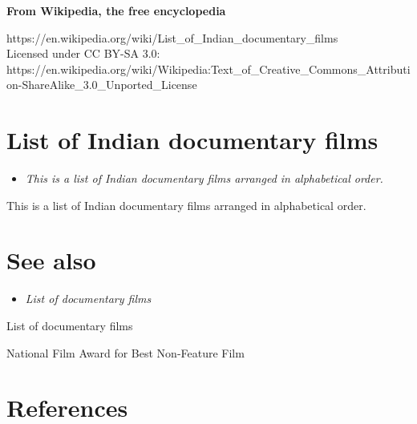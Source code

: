 \textbf{From Wikipedia, the free encyclopedia}

https://en.wikipedia.org/wiki/List\_of\_Indian\_documentary\_films\\
Licensed under CC BY-SA 3.0:\\
https://en.wikipedia.org/wiki/Wikipedia:Text\_of\_Creative\_Commons\_Attribution-ShareAlike\_3.0\_Unported\_License

\section{List of Indian documentary
films}\label{list-of-indian-documentary-films}

\begin{itemize}
\item
  \emph{This is a list of Indian documentary films arranged in
  alphabetical order.}
\end{itemize}

This is a list of Indian documentary films arranged in alphabetical
order.

\section{See also}\label{see-also}

\begin{itemize}
\item
  \emph{List of documentary films}
\end{itemize}

List of documentary films

National Film Award for Best Non-Feature Film

\section{References}\label{references}

